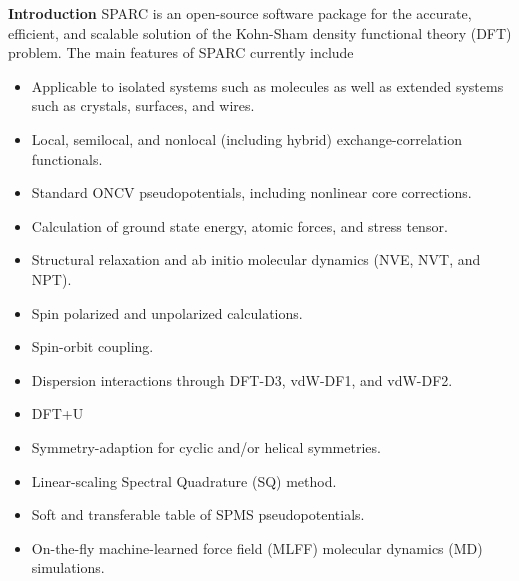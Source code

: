 \renewcommand{\thefootnote}{\fnsymbol{footnote}}

\begin{frame}[allowframebreaks]{\textbf{Introduction}} \label{Introduction}
  SPARC is an open-source software package for the accurate, efficient, and scalable solution of the Kohn-Sham density functional theory (DFT) problem. The main features of SPARC currently include
  \begin{itemize}
    \item Applicable to isolated systems such as molecules as well as extended systems such as crystals, surfaces, and wires.
    \item Local, semilocal, and nonlocal (including hybrid) exchange-correlation functionals.
    \item Standard ONCV pseudopotentials, including nonlinear core corrections.
    \item Calculation of ground state energy, atomic forces, and stress tensor.
    \item Structural relaxation and ab initio molecular dynamics (NVE, NVT, and NPT).
    \item Spin polarized and unpolarized calculations.
    \item Spin-orbit coupling.
    \item Dispersion interactions through DFT-D3, vdW-DF1, and vdW-DF2.
    \item DFT+U
    \item Symmetry-adaption for cyclic and/or helical symmetries.
    \item Linear-scaling Spectral Quadrature (SQ) method.
    \item Soft and transferable table of SPMS pseudopotentials.
    \item On-the-fly machine-learned force field (MLFF) molecular dynamics (MD) simulations.
  \end{itemize}
  
  \end{frame}

